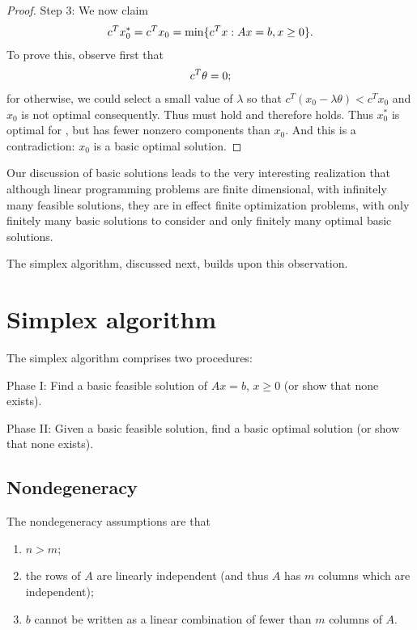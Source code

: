 \begin{proof}
Step 3:
We now claim
\begin{align}
c^T x_0^* = c^T x_0 = \min \{ c^T x : Ax=b, x\ge 0 \}. \labeq{proof_basic_sol_3}
\end{align}
To prove this, observe first that 
\begin{align}
c^T \theta = 0; \labeq{proof_basic_sol_4}
\end{align}
for otherwise, we could select a small value of $\lambda$ so that $c^T (x_0 - \lambda \theta) < c^T x_0$ and $x_0$ is not optimal consequently.
Thus  must hold and therefore  holds. 
Thus $x_0^*$ is optimal for , but has fewer nonzero components than $x_0$.
And this is a contradiction: $x_0$ is a basic optimal solution.
\end{proof}

\begin{remark}
Our discussion of basic solutions leads to the very interesting realization that although linear programming problems are finite dimensional, with infinitely many feasible solutions, they are in effect finite optimization problems, with only finitely many basic solutions to consider and only finitely many optimal basic solutions.

The simplex algorithm, discussed next, builds upon this observation.
\end{remark}

\section{Simplex algorithm}
The simplex algorithm comprises two procedures:

Phase I: Find a basic feasible solution of $Ax = b$, $x \ge 0$ (or show that none exists).

Phase II: Given a basic feasible solution, find a basic optimal solution (or show that none exists).

\subsection{Nondegeneracy}
\begin{assumption}[Nondegeneracy]
The nondegeneracy assumptions are that
\begin{enumerate}
    \item $n > m$;
    \item the rows of $A$ are linearly independent (and thus $A$ has $m$ columns which are independent);
    \item $b$ cannot be written as a linear combination of fewer than $m$ columns of $A$.
\end{enumerate}
\end{assumption}

